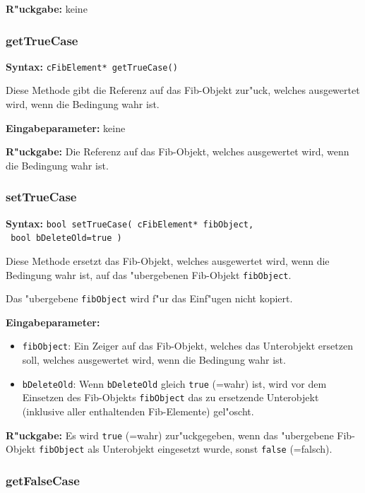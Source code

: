 \bigskip\noindent
\textbf{R"uckgabe:} keine


\subsubsection{getTrueCase}

\textbf{Syntax:} \verb|cFibElement* getTrueCase()|

\bigskip\noindent
Diese Methode gibt die Referenz auf das Fib-Objekt zur"uck, welches ausgewertet wird, wenn die Bedingung wahr ist.

\bigskip\noindent
\textbf{Eingabeparameter:} keine

\bigskip\noindent
\textbf{R"uckgabe:} Die Referenz auf das Fib-Objekt, welches ausgewertet wird, wenn die Bedingung wahr ist.


\subsubsection{setTrueCase}

\textbf{Syntax:} \verb|bool setTrueCase( cFibElement* fibObject,| \\\verb| bool bDeleteOld=true )|

\bigskip\noindent
Diese Methode ersetzt das Fib-Objekt, welches ausgewertet wird, wenn die Bedingung wahr ist, auf das "ubergebenen Fib-Objekt \verb|fibObject|.

Das "ubergebene \verb|fibObject| wird f"ur das Einf"ugen nicht kopiert.

\bigskip\noindent
\textbf{Eingabeparameter:}
\begin{itemize}
 \item \verb|fibObject|: Ein Zeiger auf das Fib-Objekt, welches das Unterobjekt ersetzen soll, welches ausgewertet wird, wenn die Bedingung wahr ist.
 \item \verb|bDeleteOld|: Wenn \verb|bDeleteOld| gleich \verb|true| (=wahr) ist, wird vor dem Einsetzen des Fib-Objekts \verb|fibObject| das zu ersetzende Unterobjekt (inklusive aller enthaltenden Fib-Elemente) gel"oscht.
\end{itemize}

\bigskip\noindent
\textbf{R"uckgabe:} Es wird \verb|true| (=wahr) zur"uckgegeben, wenn das "ubergebene Fib-Objekt \verb|fibObject| als Unterobjekt eingesetzt wurde, sonst \verb|false| (=falsch).


\subsubsection{getFalseCase}

